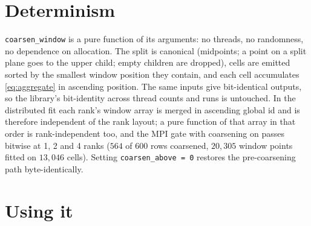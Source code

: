 \documentclass[11pt]{article}
\newcommand{\code}[1]{\texttt{#1}}
\begin{document}
\section{Determinism}

\code{coarsen\_window} is a pure function of its arguments: no threads, no
randomness, no dependence on allocation. The split is canonical (midpoints; a
point on a split plane goes to the upper child; empty children are dropped),
cells are emitted sorted by the smallest window position they contain, and
each cell accumulates \eqref{eq:aggregate} in ascending position. The same
inputs give bit-identical outputs, so the library's bit-identity across
thread counts and runs is untouched. In the distributed fit each rank's
window array is merged in ascending global id and is therefore independent
of the rank layout; a pure function of that array in that order is
rank-independent too, and the MPI gate with coarsening on passes bitwise at
1, 2 and 4 ranks ($564$ of $600$ rows coarsened, $20{,}305$ window points
fitted on $13{,}046$ cells). Setting \code{coarsen\_above = 0} restores the
pre-coarsening path byte-identically.

\section{Using it}
\end{document}
